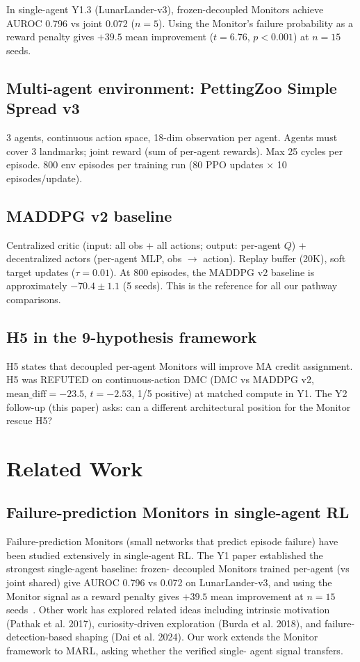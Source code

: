 \documentclass[11pt]{article}
\begin{document}
In single-agent Y1.3 (LunarLander-v3), frozen-decoupled Monitors
achieve AUROC 0.796 vs joint 0.072 ($n=5$). Using the Monitor's
failure probability as a reward penalty gives $+39.5$ mean
improvement ($t=6.76$, $p<0.001$) at $n=15$ seeds.

\subsection{Multi-agent environment: PettingZoo Simple Spread v3}

3 agents, continuous action space, 18-dim observation per agent.
Agents must cover 3 landmarks; joint reward (sum of per-agent
rewards). Max 25 cycles per episode. 800 env episodes per training
run (80 PPO updates $\times$ 10 episodes/update).

\subsection{MADDPG v2 baseline}

Centralized critic (input: all obs + all actions; output: per-agent
$Q$) + decentralized actors (per-agent MLP, obs $\to$ action).
Replay buffer (20K), soft target updates ($\tau=0.01$). At 800
episodes, the MADDPG v2 baseline is approximately $-70.4 \pm 1.1$
(5 seeds). This is the reference for all our pathway comparisons.

\subsection{H5 in the 9-hypothesis framework}

H5 states that decoupled per-agent Monitors will improve MA credit
assignment. H5 was REFUTED on continuous-action DMC (DMC vs
MADDPG v2, $\text{mean\_diff}=-23.5$, $t=-2.53$, 1/5 positive) at
matched compute in Y1. The Y2 follow-up (this paper) asks: can a
different architectural position for the Monitor rescue H5?

\section{Related Work}

\subsection{Failure-prediction Monitors in single-agent RL}

Failure-prediction Monitors (small networks that predict episode
failure) have been studied extensively in single-agent RL. The Y1
paper established the strongest single-agent baseline: frozen-
decoupled Monitors trained per-agent (vs joint shared) give
AUROC 0.796 vs 0.072 on LunarLander-v3, and using the Monitor
signal as a reward penalty gives $+39.5$ mean improvement at
$n=15$ seeds~\cite{liu2026y1}. Other work has explored related
ideas including intrinsic motivation (Pathak et al. 2017),
curiosity-driven exploration (Burda et al. 2018), and failure-
detection-based shaping (Dai et al. 2024). Our work extends the
Monitor framework to MARL, asking whether the verified single-
agent signal transfers.
\end{document}
